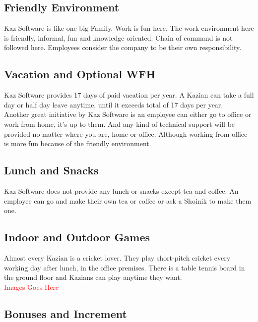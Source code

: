 \subsection{Friendly Environment}

Kaz Software is like one big Family.
Work is fun here.
The work environment here is friendly, informal, fun and knowledge oriented.
Chain of command is not followed here.
Employees consider the company to be their own responsibility.

\subsection{Vacation and Optional WFH}

Kaz Software provides 17 days of paid vacation per year. 
A Kazian can take a full day or half day leave anytime, until it exceeds total of 17 days per year.\\

Another great initiative by Kaz Software is an employee can either go to office or work from home, it's up to them.
And any kind of technical support will be provided no matter where you are, home or office.
Although working from office is more fun because of the friendly environment.

\subsection{Lunch and Snacks}

Kaz Software does not provide any lunch or snacks except tea and coffee.
An employee can go and make their own tea or coffee or ask a Shoinik to make them one.

\subsection{Indoor and Outdoor Games}

Almost every Kazian is a cricket lover.
They play short-pitch cricket every working day after lunch, in the office premises.
There is a table tennis board in the ground floor and Kazians can play anytime they want.
\\

\textcolor{red}{\LARGE Images Goes Here}

\subsection{Bonuses and Increment}

